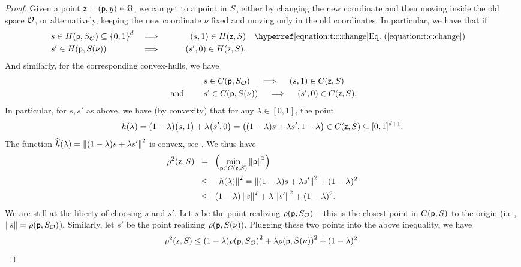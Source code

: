 \begin{proof}
    Given a point ${\mathsf{z}} = (\mathsf{p},y) \in \Omega$, we can get to a point
    in $S$, either by changing the new coordinate and then moving
    inside the old space ${\mathcal{O}}$, or alternatively, keeping the new
    coordinate $\nu$ fixed and moving only in the old coordinates. In
    particular, we have that if
    \smallskip%
    \begin{align*}
        &s \in \HSetY{\pnt}{\SetA_\OldOm} \subseteq \brc{0,1}^d
        &\implies&& \quad(s,1) \in \HSetY{\pntE}{\SetA}
        &\quad\text{\Eqref{t:c:change}}\quad \\%
        &s' \in \HSetY{\pnt}{\SetA(\nu)} & \implies&& \qquad(s',0) \in
        \HSetY{\pntE}{\SetA}.
    \end{align*}
    And similarly, for the corresponding convex-hulls, we have
    \begin{align*}
        &s \in \CHSetY{\pnt}{\SetA_\OldOm} 
        \quad\implies\quad 
        (s,1) \in \CHSetY{\pntE}{\SetA}
        \\
       \text{ and }\qquad%
        &
        s' \in \CHSetY{\pnt}{\SetA(\nu)}
        \quad\implies\quad
        (s',0) \in \CHSetY{\pntE}{\SetA}.
    \end{align*}
    In particular, for $s, s'$ as above, we have (by convexity) that for
    any $\lambda \in [0,1]$, the point
    \begin{equation*}
        h(\lambda)%
        =%
        (1-\lambda)\bigl(s,1\bigr) + \lambda \bigl(s',0\bigr)%
        =%
        \bigl( (1-\lambda)s + \lambda s', 1-\lambda \bigr)
        \in%
        \CHSetY{\pntE}{\SetA}%
        \subseteq%
        [0,1]^{d+1}.
    \end{equation*}
    The function
    \begin{math}
        \widehat{h}\pth{\lambda} = \norm{ (1-\lambda)s + \lambda s'}^2
    \end{math}    
    is convex, see . We thus have
    \begin{align*}
        \distTSqY{\pntE}{\SetA}%
        &\EQ
        \Bigl(
        \min_{\pnt \in \CHSetY{\pntE}{\SetA}} \norm{\pnt}^2
        \Bigr)
        \\&
        \LEQ%
        \norm{h(\lambda)}^2 %
        =%
        \norm{ (1-\lambda)s + \lambda s'}^2 + ( 1-\lambda)^2        
        \\&
        \LEQ%
        (1-\lambda)\norm{s}^2  + \lambda \norm{ s'}^2 + ( 1-\lambda)^2.
    \end{align*}
    We are still at the liberty of choosing $s$ and $s'$. Let $s$ be
    the point realizing $\distTY{\pnt}{\SetA_\OldOm}$ -- this is the
    closest point in $\CHSetY{\pnt}{\SetA}$ to the origin (i.e.,
    $\norm{s} = \distTY{\pnt}{\SetA_\OldOm}$). Similarly, let $s'$ be
    the point realizing $\distTY{\pnt}{\SetA(\nu)}$. Plugging these
    two points into the above inequality, we have
    \begin{equation*}
        \distTSqY{\pntE}{\SetA}%
        \leq%
        (1-\lambda)\distTY{\pnt}{\SetA_\OldOm}^2
        + \lambda \distTY{\pnt}{\SetA(\nu)}^2 + ( 1-\lambda)^2.
    \end{equation*}


\end{proof}
